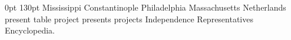 \documentclass{article}
\begin{document}
 0pt 130pt Mississippi Constantinople Philadelphia Massachusetts Netherlands present table project presents projects Independence Representatives Encyclopedia.
\end{document}
